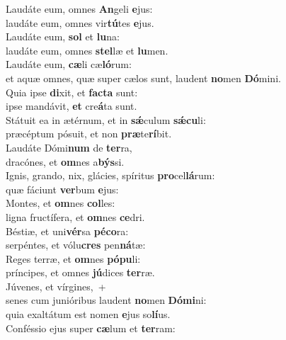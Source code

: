 \evenverse Laudáte eum, omnes \textbf{An}geli \textbf{e}jus:~\*\\
\evenverse laudáte eum, omnes vir\textbf{tú}tes \textbf{e}jus.\\
\oddverse Laudáte eum, \textbf{sol} et \textbf{lu}na:~\*\\
\oddverse laudáte eum, omnes \textbf{stel}læ et \textbf{lu}men.\\
\evenverse Laudáte eum, \textbf{cæ}li cæ\textbf{ló}rum:~\*\\
\evenverse et aquæ omnes, quæ super cælos sunt, laudent \textbf{no}men \textbf{Dó}mini.\\
\oddverse Quia ipse \textbf{di}xit, et \textbf{fa}\textbf{cta} sunt:~\*\\
\oddverse ipse mandávit, \textbf{et} cre\textbf{á}ta sunt.\\
\evenverse Státuit ea in ætérnum, et in \textbf{sǽ}culum \textbf{sǽ}\textbf{cu}li:~\*\\
\evenverse præcéptum pósuit, et non \textbf{præ}te\textbf{rí}bit.\\
\oddverse Laudáte Dómi\textbf{num} de \textbf{ter}ra,~\*\\
\oddverse dracónes, et \textbf{om}nes a\textbf{býs}si.\\
\evenverse Ignis, grando, nix, glácies, spíritus \textbf{pro}cel\textbf{lá}rum:~\*\\
\evenverse quæ fáciunt \textbf{ver}bum \textbf{e}jus:\\
\oddverse Montes, et \textbf{om}nes \textbf{col}les:~\*\\
\oddverse ligna fructífera, et \textbf{om}nes \textbf{ce}dri.\\
\evenverse Béstiæ, et uni\textbf{vér}sa \textbf{pé}\textbf{co}ra:~\*\\
\evenverse serpéntes, et vólu\textbf{cres} pen\textbf{ná}tæ:\\
\oddverse Reges terræ, et \textbf{om}nes \textbf{pó}\textbf{pu}li:~\*\\
\oddverse príncipes, et omnes \textbf{jú}dices \textbf{ter}ræ.\\
\evenverse Júvenes, et vírgines,~+\\
\evenverse  senes cum junióribus laudent \textbf{no}men \textbf{Dó}\textbf{mi}ni:~\*\\
\evenverse quia exaltátum est nomen \textbf{e}jus so\textbf{lí}us.\\
\oddverse Conféssio ejus super \textbf{cæ}lum et \textbf{ter}ram:~\*\\
